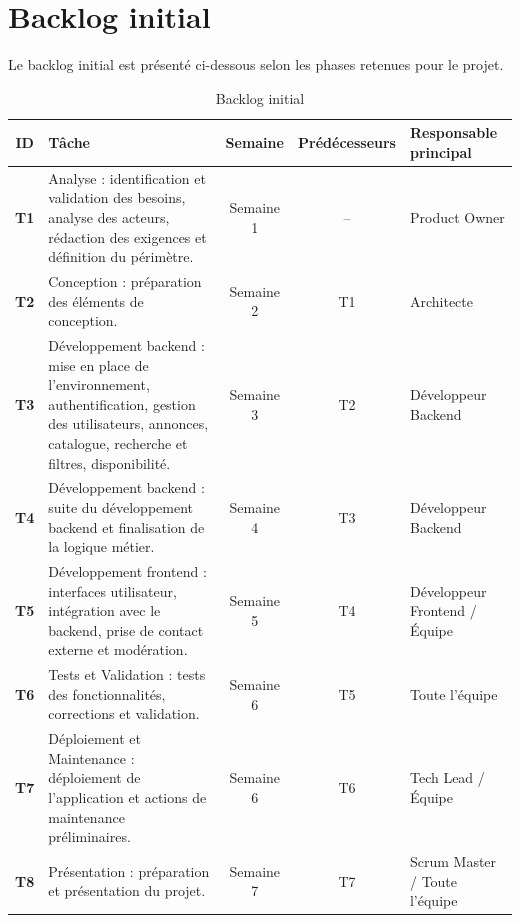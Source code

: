 ﻿\chapter{Backlog initial}

Le backlog initial est présenté ci-dessous selon les phases retenues pour le projet.

\begin{table}[ht]
\centering
\renewcommand{\arraystretch}{1.25}
\small
\begin{tabularx}{\textwidth}{>{\bfseries}c X c c X}
\toprule
\textbf{ID} & \textbf{Tâche} & \textbf{Semaine} & \textbf{Prédécesseurs} & \textbf{Responsable principal} \\
\midrule
T1 & Analyse : identification et validation des besoins, analyse des acteurs, rédaction des exigences et définition du périmètre. & Semaine 1 & -- & Product Owner \\
T2 & Conception : préparation des éléments de conception. & Semaine 2 & T1 & Architecte \\
T3 & Développement backend : mise en place de l'environnement, authentification, gestion des utilisateurs, annonces, catalogue, recherche et filtres, disponibilité. & Semaine 3 & T2 & Développeur Backend \\
T4 & Développement backend : suite du développement backend et finalisation de la logique métier. & Semaine 4 & T3 & Développeur Backend \\
T5 & Développement frontend : interfaces utilisateur, intégration avec le backend, prise de contact externe et modération. & Semaine 5 & T4 & Développeur Frontend / Équipe \\
T6 & Tests et Validation : tests des fonctionnalités, corrections et validation. & Semaine 6 & T5 & Toute l'équipe \\
T7 & Déploiement et Maintenance : déploiement de l'application et actions de maintenance préliminaires. & Semaine 6 & T6 & Tech Lead / Équipe \\
T8 & Présentation : préparation et présentation du projet. & Semaine 7 & T7 & Scrum Master / Toute l'équipe \\
\bottomrule
\end{tabularx}
\caption{Backlog initial}
\end{table}
